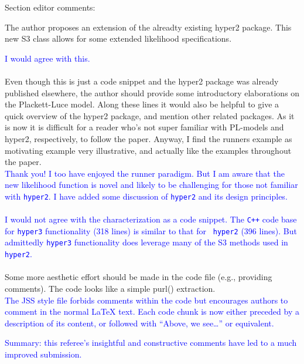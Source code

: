 \documentclass[12pt]{article}
\begin{document}
Section editor comments:

The author proposes an extension of the alreadty existing hyper2 package.
This new S3 class allows for some extended likelihood specifications.

\textcolor{blue}{I would agree with this.}\\ \\


Even though this is just a code snippet and the hyper2 package was
already published elsewhere, the author should provide some
introductory elaborations on the Plackett-Luce model. Along these
lines it would also be helpful to give a quick overview of the hyper2
package, and mention other related packages. As it is now it is
difficult for a reader who's not super familiar with PL-models and
hyper2, respectively, to follow the paper. Anyway, I find the runners
example as motivating example very illustrative, and actually like the
examples throughout the paper.\\ \textcolor{blue}{Thank you!  I too
  have enjoyed the runner paradigm.  But I am aware that the new
  likelihood function is novel and likely to be challenging for those
  not familiar with {\tt hyper2}.  I have added some discussion of
  {\tt hyper2} and its design principles.\\ \\I would not agree with
  the characterization as a code snippet.  The {\tt C++} code base for
  {\tt hyper3} functionality (318 lines) is similar to that for {\tt
    hyper2} (396 lines).  But admittedly {\tt hyper3} functionality
  does leverage many of the S3 methods used in {\tt hyper2}.}\\ \\

Some more aesthetic effort should be made in the code file (e.g.,
providing comments). The code looks like a simple purl()
extraction.\\ \textcolor{blue}{The JSS style file forbids comments
  within the code but encourages authors to comment in the normal
  LaTeX text.  Each code chunk is now either preceded by a description
  of its content, or followed with ``Above, we see\ldots'' or
  equivalent.}

\textcolor{blue}{Summary: this referee's insightful and
  constructive comments have led to a much improved submission.}
\end{document}
